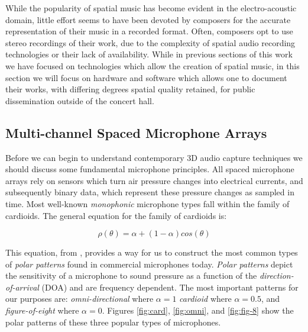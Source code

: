 While the popularity of spatial music has become evident in the electro-acoustic domain, little effort seems to have been devoted by composers for the accurate representation of their music in a recorded format. Often, composers opt to use stereo recordings of their work, due to the complexity of spatial audio recording technologies or their lack of availability. While in previous sections of this work we have focused on technologies which allow the creation of spatial music, in this section we will focus on hardware and software which allows one to document their works, with differing degrees spatial quality retained, for public dissemination outside of the concert hall. 

\subsection{Multi-channel Spaced Microphone Arrays}


Before we can begin to understand contemporary 3D audio capture techniques we should discuss some fundamental microphone principles. All spaced microphone arrays rely on sensors which turn air pressure changes into electrical currents, and subsequently binary data, which represent these pressure changes as sampled in time. Most well-known \textit{monophonic} microphone types fall within the family of cardioids. The general equation for the family of cardioids is:

\begin{equation}
    \rho(\theta) = \alpha + (1-\alpha)cos(\theta)
\end{equation}

This equation, from \cite{ortolani2015introduction}, provides a way for us to construct the most common types of \textit{polar patterns} found in commercial microphones today. \textit{Polar patterns} depict the sensitivity of a microphone to sound pressure as a function of the \textit{direction-of-arrival} (DOA) and are frequency dependent. The most important patterns for our purposes are: \textit{omni-directional} where $\alpha=1$ \textit{cardioid} where $\alpha = 0.5$, and \textit{figure-of-eight} where $\alpha=0$. Figures \ref{fig:card}, \ref{fig:omni}, and \ref{fig:fig-8} show the polar patterns of these three popular types of microphones. 

